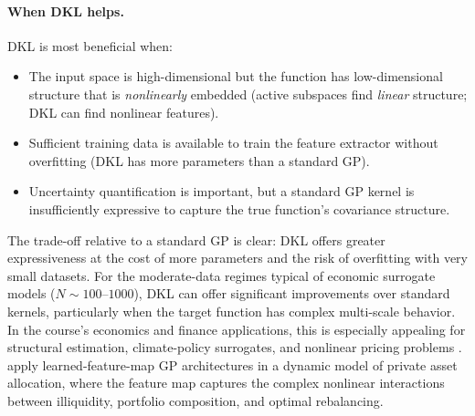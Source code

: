 \documentclass[11pt,a4paper]{report}
\begin{document}
\paragraph{When DKL helps.}
DKL is most beneficial when:
\begin{itemize}[itemsep=2pt]
\item The input space is high-dimensional but the function has low-dimensional structure that is \emph{nonlinearly} embedded (active subspaces find \emph{linear} structure; DKL can find nonlinear features).
\item Sufficient training data is available to train the feature extractor without overfitting (DKL has more parameters than a standard GP).
\item Uncertainty quantification is important, but a standard GP kernel is insufficiently expressive to capture the true function's covariance structure.
\end{itemize}
The trade-off relative to a standard GP is clear: DKL offers greater expressiveness at the cost of more parameters and the risk of overfitting with very small datasets.  For the moderate-data regimes typical of economic surrogate models ($N \sim 100$--$1000$), DKL can offer significant improvements over standard kernels, particularly when the target function has complex multi-scale behavior.  In the course's economics and finance applications, this is especially appealing for structural estimation, climate-policy surrogates, and nonlinear pricing problems \citep{barnett2020pricing, friedlDeep2023, kubler2025using}.  \citet{chen2025private} apply learned-feature-map GP architectures in a dynamic model of private asset allocation, where the feature map captures the complex nonlinear interactions between illiquidity, portfolio composition, and optimal rebalancing.
\end{document}
